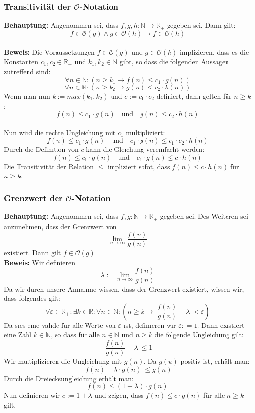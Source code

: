 \documentclass[12px,a4paper]{article}
\begin{document}
\subsubsection{Transitivität der $\mathcal{O}$-Notation}
\textbf{Behauptung:} Angenommen sei, dass $f, g, h: \mathbb{N} \rightarrow \mathbb{R}_+$ gegeben sei. Dann gilt: $$f \in \mathcal{O}(g) \land g \in \mathcal{O}(h) \rightarrow f \in \mathcal{O}(h) $$ \\

\textbf{Beweis:} Die Voraussetzungen $f \in \mathcal{O} (g)$ und $g \in \mathcal{O} (h)$  implizieren, dass es die Konstanten $c_1, c_2 \in \mathbb{R}_+$ und $k_1, k_2\in \mathbb{N}$ gibt, so dass die folgenden Aussagen zutreffend sind: $$\forall n \in \mathbb{N} : (n \geq k_1 \rightarrow f(n) \leq c_1 \cdot g(n))$$ 
	$$\forall n \in \mathbb{N} : (n \geq k_2 \rightarrow g(n) \leq c_2 \cdot h(n))$$ 
	Wenn man nun $k:= max(k_1,k_2)$ und $c:=c_1 \cdot c_2$ definiert, dann gelten für $n \geq k$:
	$$f(n) \leq c_1 \cdot g(n) \quad \textrm{und} \quad g(n) \leq c_2 \cdot h(n)$$ \\
	Nun wird die rechte Ungleichung mit $c_1$ multipliziert:
	$$f(n) \leq c_1 \cdot  g(n) \quad \textrm{und} \quad c_1 \cdot g(n) \leq c_1 \cdot c_2 \cdot h(n)$$
	Durch die Definition von $c$ kann die Gleichung vereinfacht werden: 
	$$f(n) \leq  c_1 \cdot  g(n) \quad \textrm{und} \quad c_1 \cdot g(n) \leq c \cdot h(n)$$
	Die Transitivität der Relation $\leq$ impliziert sofot, dass $f(n) \leq c \cdot h(n)$ für $n \geq k$.


\subsubsection{Grenzwert der $\mathcal{O}$-Notation}
\textbf{Behauptung:} Angenommen sei, dass $f, g: \mathbb{N} \rightarrow \mathbb{R}_+$ gegeben sei. Des Weiteren sei anzunehmen, dass der Grenzwert von $$\lim_{n \rightarrow \infty} \frac{f(n)}{g(n)}$$ existiert. Dann gilt $f \in \mathcal{O}(g)$\\
	\textbf{Beweis:} Wir definieren $$\lambda := \lim_{n \rightarrow \infty} \frac{f(n)}{g(n)} $$
	Da wir durch unsere Annahme wissen, dass der Grenzwert existiert, wissen wir, dass folgendes gilt:
	$$\forall \varepsilon \in \mathbb{R}_+ : \exists k \in \mathbb{R} : \forall n \in \mathbb{N} : (n \geq k \rightarrow \vert \frac{f(n)}{g(n)} - \lambda \vert <  \varepsilon )$$
	Da sies eine valide für alle Werte von $\varepsilon$ ist, definieren wir $\varepsilon : = 1$. Dann existiert eine Zahl $k \in \mathbb{N}$, so dass für alle $n \in \mathbb{N}$ und $n \geq k$ die folgende Ungleichung gilt:
	$$\vert \frac{f(n)}{g(n)} - \lambda \vert \leq 1$$  
	Wir multiplizieren die Ungleichung mit $g(n)$. Da $g(n)$ positiv ist, erhält man:
	$$\vert f(n) - \lambda \cdot g(n) \vert \leq g(n)$$
	Durch die Dreiecksungleichung erhält man:
	$$f(n) \leq (1+ \lambda ) \cdot g(n)$$
	Nun definieren wir $c:= 1 + \lambda$ und zeigen, dass $f(n) \leq c \cdot g(n)$ für alle $n \geq k$ gilt.
\end{document}
